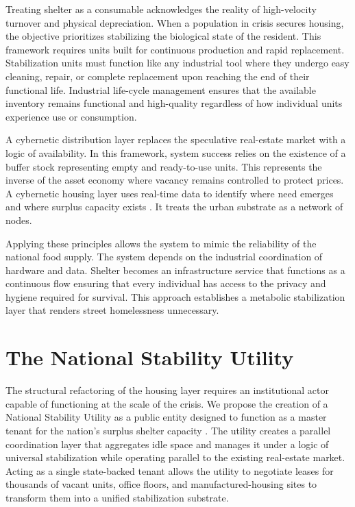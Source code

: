 \documentclass[12pt, letterpaper]{article}
\begin{document}
Treating shelter as a consumable acknowledges the reality of high-velocity turnover and physical depreciation. When a population in crisis secures housing, the objective prioritizes stabilizing the biological state of the resident. This framework requires units built for continuous production and rapid replacement. Stabilization units must function like any industrial tool where they undergo easy cleaning, repair, or complete replacement upon reaching the end of their functional life. Industrial life-cycle management ensures that the available inventory remains functional and high-quality regardless of how individual units experience use or consumption.

A cybernetic distribution layer replaces the speculative real-estate market with a logic of availability. In this framework, system success relies on the existence of a buffer stock representing empty and ready-to-use units. This represents the inverse of the asset economy where vacancy remains controlled to protect prices. A cybernetic housing layer uses real-time data to identify where need emerges and where surplus capacity exists \citep{beer_1972, beer_1981, ashby_1956, wiener_1948}. It treats the urban substrate as a network of nodes.

Applying these principles allows the system to mimic the reliability of the national food supply. The system depends on the industrial coordination of hardware and data. Shelter becomes an infrastructure service that functions as a continuous flow ensuring that every individual has access to the privacy and hygiene required for survival. This approach establishes a metabolic stabilization layer that renders street homelessness unnecessary.

\section{The National Stability Utility}

The structural refactoring of the housing layer requires an institutional actor capable of functioning at the scale of the crisis. We propose the creation of a National Stability Utility as a public entity designed to function as a master tenant for the nation's surplus shelter capacity \citep{beer_1972}. The utility creates a parallel coordination layer that aggregates idle space and manages it under a logic of universal stabilization while operating parallel to the existing real-estate market. Acting as a single state-backed tenant allows the utility to negotiate leases for thousands of vacant units, office floors, and manufactured-housing sites to transform them into a unified stabilization substrate.
\end{document}
